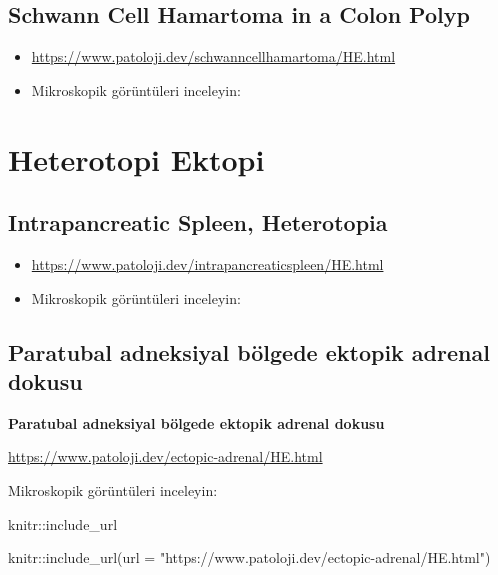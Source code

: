 \documentclass[
  letterpaper,
  DIV=11,
  numbers=noendperiod]{scrreprt}
\newenvironment{Shaded}{}{}
\newcommand{\AttributeTok}[1]{\textcolor[rgb]{0.49,0.56,0.16}{#1}}
\newcommand{\FunctionTok}[1]{\textcolor[rgb]{0.02,0.16,0.49}{#1}}
\newcommand{\NormalTok}[1]{#1}
\newcommand{\SpecialCharTok}[1]{\textcolor[rgb]{0.25,0.44,0.63}{#1}}
\newcommand{\StringTok}[1]{\textcolor[rgb]{0.25,0.44,0.63}{#1}}
\begin{document}
\hypertarget{schwann-cell-hamartoma-in-a-colon-polyp}{%
\section{Schwann Cell Hamartoma in a Colon
Polyp}\label{schwann-cell-hamartoma-in-a-colon-polyp}}

\begin{itemize}
\item
  \url{https://www.patoloji.dev/schwanncellhamartoma/HE.html}
\item
  Mikroskopik görüntüleri inceleyin:
\end{itemize}

\hypertarget{heterotopi-ektopi}{%
\chapter{Heterotopi Ektopi}\label{heterotopi-ektopi}}

\hypertarget{intrapancreatic-spleen-heterotopia}{%
\section{Intrapancreatic Spleen,
Heterotopia}\label{intrapancreatic-spleen-heterotopia}}

\begin{itemize}
\item
  \url{https://www.patoloji.dev/intrapancreaticspleen/HE.html}
\item
  Mikroskopik görüntüleri inceleyin:
\end{itemize}

\hypertarget{paratubal-adneksiyal-buxf6lgede-ektopik-adrenal-dokusu}{%
\section{Paratubal adneksiyal bölgede ektopik adrenal
dokusu}\label{paratubal-adneksiyal-buxf6lgede-ektopik-adrenal-dokusu}}

\textbf{Paratubal adneksiyal bölgede ektopik adrenal dokusu}

\url{https://www.patoloji.dev/ectopic-adrenal/HE.html}

Mikroskopik görüntüleri inceleyin:

knitr::include\_url

\begin{Shaded}
\begin{Highlighting}[]
\NormalTok{knitr}\SpecialCharTok{::}\FunctionTok{include\_url}\NormalTok{(}\AttributeTok{url =} \StringTok{"https://www.patoloji.dev/ectopic{-}adrenal/HE.html"}\NormalTok{)}
\end{Highlighting}
\end{Shaded}
\end{document}
